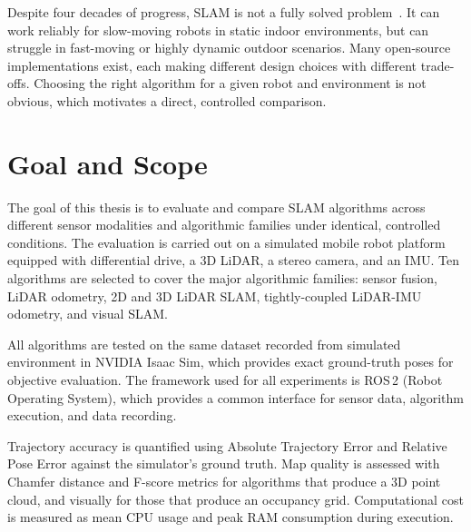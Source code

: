 
Despite four decades of progress, SLAM is not a fully solved
problem~\cite{cadena2016past}. It can work reliably for slow-moving robots in
static indoor environments, but can struggle in fast-moving or highly dynamic
outdoor scenarios. Many open-source implementations exist, each making different design choices
with different trade-offs.
Choosing the right algorithm for a given robot and environment is not obvious,
which motivates a direct, controlled comparison.

\section{Goal and Scope}

The goal of this thesis is to evaluate and compare SLAM algorithms across different sensor
modalities and algorithmic families under identical, controlled conditions.
The evaluation is carried out on a simulated mobile robot platform equipped with differential drive,
a 3D LiDAR, a stereo camera, and an IMU.
Ten algorithms are selected to cover the major algorithmic families: sensor fusion,
LiDAR odometry, 2D and 3D LiDAR SLAM, tightly-coupled LiDAR-IMU odometry, and
visual SLAM.

All algorithms are tested on the same dataset recorded from simulated
environment in NVIDIA Isaac Sim, which provides exact ground-truth poses for objective
evaluation.
The framework used for all experiments is ROS\,2 (Robot Operating System), which
provides a common interface for sensor data, algorithm execution, and data recording.

Trajectory accuracy is quantified using Absolute Trajectory Error and Relative Pose Error
against the simulator's ground truth.
Map quality is assessed with Chamfer distance and F-score metrics for algorithms that
produce a 3D point cloud, and visually for those that produce an occupancy grid.
Computational cost is measured as mean CPU usage and peak RAM consumption during
execution.


